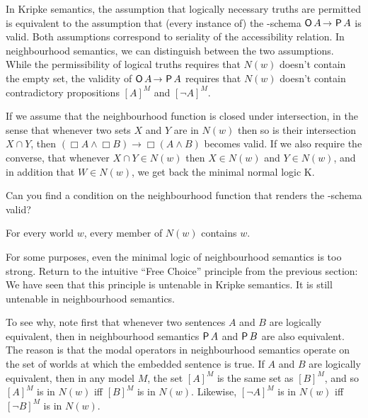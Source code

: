 In Kripke semantics, the assumption that logically necessary truths are
permitted is equivalent to the assumption that (every instance of) the
-schema $\Ob A \to \Pe A$ is valid. Both assumptions correspond to
seriality of the accessibility relation. In neighbourhood semantics, we can
distinguish between the two assumptions. While the permissibility of logical
truths requires that $N(w)$ doesn't contain the empty set, the validity of
$\Ob A \to \Pe A$ requires that $N(w)$ doesn't contain contradictory
propositions $[A]^M$ and $[\neg A]^M$.

If we assume that the neighbourhood function is closed under intersection, in
the sense that whenever two sets $X$ and $Y$ are in $N(w)$ then so is their
intersection $X\cap Y$, then $(\Box A \land \Box B) \to \Box (A \land B)$
becomes valid. If we also require the converse, that whenever $X\cap Y \in N(w)$
then $X \in N(w)$ and $Y\in N(w)$, and in addition that $W \in N(w)$, we get
back the minimal normal logic K.


\begin{exercise}
  Can you find a condition on the neighbourhood function that renders the
  -schema valid?
\end{exercise}
\begin{solution}
  For every world $w$, every member of $N(w)$ contains $w$.
\end{solution}

For some purposes, even the minimal logic of neighbourhood semantics is too
strong. Return to the intuitive ``Free Choice'' principle from the previous
section:
%
%
We have seen that this principle is untenable in Kripke semantics. It is
still untenable in neighbourhood semantics.

To see why, note first that whenever two sentences $A$ and $B$ are logically
equivalent, then in neighbourhood semantics $\operatorname{\mathsf{P}} A$ and $\operatorname{\mathsf{P}} B$ are also
equivalent. The reason is that the modal operators in neighbourhood semantics
operate on the set of worlds at which the embedded sentence is true. If $A$ and
$B$ are logically equivalent, then in any model $M$, the set $[A]^M$ is the same
set as $[B]^M$, and so $[A]^M$ is in $N(w)$ iff $[B]^M$ is in $N(w)$. Likewise,
$[\neg A]^M$ is in $N(w)$ iff $[\neg B]^M$ is in $N(w)$.

